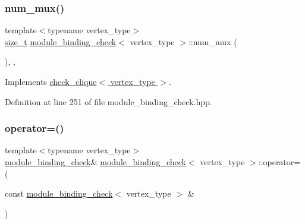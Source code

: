 \subsubsection{\texorpdfstring{num\+\_\+mux()}{num\_mux()}}
{\footnotesize\ttfamily template$<$typename vertex\+\_\+type$>$ \\
\hyperlink{tutorial__fpt__2017_2intro_2sixth_2test_8c_a7c94ea6f8948649f8d181ae55911eeaf}{size\+\_\+t} \hyperlink{structmodule__binding__check}{module\+\_\+binding\+\_\+check}$<$ vertex\+\_\+type $>$\+::num\+\_\+mux (\begin{DoxyParamCaption}{ }\end{DoxyParamCaption})\hspace{0.3cm}{\ttfamily [inline]}, {\ttfamily [override]}, {\ttfamily [virtual]}}



Implements \hyperlink{structcheck__clique_af124519bb9bb0f5476b38a20b8a7303b}{check\+\_\+clique$<$ vertex\+\_\+type $>$}.



Definition at line 251 of file module\+\_\+binding\+\_\+check.\+hpp.

\mbox{\label{structmodule__binding__check_a5574b327197e323b7e422e7ee8f43ad7}} 
\subsubsection{\texorpdfstring{operator=()}{operator=()}}
{\footnotesize\ttfamily template$<$typename vertex\+\_\+type$>$ \\
\hyperlink{structmodule__binding__check}{module\+\_\+binding\+\_\+check}\& \hyperlink{structmodule__binding__check}{module\+\_\+binding\+\_\+check}$<$ vertex\+\_\+type $>$\+::operator= (\begin{DoxyParamCaption}\item[{const \hyperlink{structmodule__binding__check}{module\+\_\+binding\+\_\+check}$<$ vertex\+\_\+type $>$ \&}]{ }\end{DoxyParamCaption})\hspace{0.3cm}{\ttfamily [delete]}}

\mbox{\label{structmodule__binding__check_ae76cbfa7bdfffd10adf7033c67224798}} 
